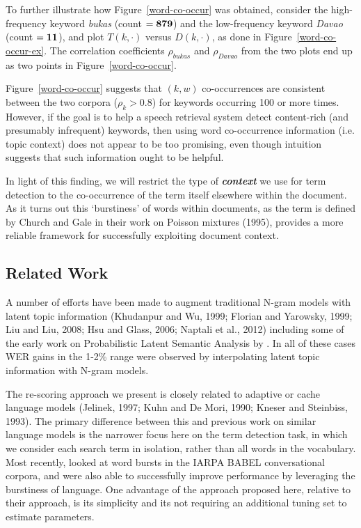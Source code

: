 \documentclass[11pt]{article}
\begin{document}
To further illustrate how Figure~\ref{word-co-occur} was obtained, consider the high-frequency keyword \textit{bukas} (count $={\bf 879}$) and the low-frequency keyword \textit{Davao} (count $={\bf 11}$), and plot $T(k,\cdot)$ versus $D(k,\cdot)$, as done in Figure~\ref{word-co-occur-ex}.  The correlation coefficients $\rho_{\mathrm{\textit{bukas}}}$ and $\rho_{\mathrm{\textit{Davao}}}$ from the two plots end up as two points in Figure~\ref{word-co-occur}.

Figure~\ref{word-co-occur} suggests that $(k,w)$ co-occurrences are consistent between the two corpora ($\rho_k>0.8$) for keywords occurring 100 or more times.  However, if the goal is to help a speech retrieval system detect content-rich (and presumably infrequent) keywords, then using word co-occurrence information (i.e. topic context) does not appear to be too promising, even though intuition suggests that such information ought to be helpful.

In light of this finding, we will restrict the type of \textbf{\textit{context}} we use for term detection to the co-occurrence of the term itself elsewhere within the document.   As it turns out this `burstiness' of words within documents, as the term is defined by Church and Gale in their work on Poisson mixtures (1995), provides a more reliable framework for successfully exploiting document context.
\subsection{Related Work}

A number of efforts have been made to augment traditional N-gram models with latent topic information (Khudanpur and Wu, 1999; Florian and
Yarowsky, 1999; Liu and Liu, 2008; Hsu and Glass, 2006; Naptali et al., 2012) including some of the early work on Probabilistic Latent Semantic Analysis by .  In all of these cases WER gains in the 1-2\% range were observed by interpolating latent topic information with N-gram models.  

\nocite{khudanpur1999,florian1999,liu2008,hsu2006,naptali2012} 

The re-scoring approach we present is closely related to adaptive or cache language models (Jelinek, 1997; Kuhn and De Mori, 1990; Kneser and Steinbiss, 1993).  The primary difference between this and previous work on similar language models is the narrower focus here on the term detection task, in which we consider each search term in isolation, rather than all words in the vocabulary.  Most recently,  looked at word bursts in the {\small IARPA BABEL} conversational corpora, and were also able to successfully improve performance by leveraging the burstiness of language.  One advantage of the approach proposed here, relative to their approach, is its simplicity and its not requiring an additional tuning set to estimate parameters. %
\end{document}
